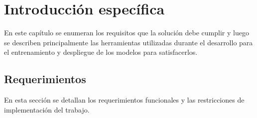 \chapter{Introducción específica} %

\label{Chapter2}

En este capítulo se enumeran los requisitos que la solución debe cumplir y luego se describen principalmente las herramientas utilizadas durante el desarrollo para el entrenamiento y despliegue de los modelos para satisfacerlos.

\section{Requerimientos}

En esta sección se detallan los requerimientos funcionales y las restricciones de implementación del trabajo.


